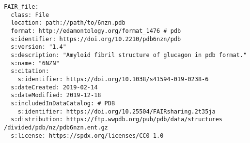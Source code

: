 \begin{verbatim}
FAIR_file:
  class: File
  location: path://path/to/6nzn.pdb
  format: http://edamontology.org/format_1476 # pdb
  s:identifier: https://doi.org/10.2210/pdb6nzn/pdb 
  s:version: "1.4"
  s:description: "Amyloid fibril structure of glucagon in pdb format."
  s:name: "6NZN"
  s:citation: 
    s:identifier: https://doi.org/10.1038/s41594-019-0238-6
  s:dateCreated: 2019-02-14
  s:dateModified: 2019-12-18 
  s:includedInDataCatalog: # PDB
    s:identifier: https://doi.org/10.25504/FAIRsharing.2t35ja
  s:distribution: https://ftp.wwpdb.org/pub/pdb/data/structures /divided/pdb/nz/pdb6nzn.ent.gz
  s:license: https://spdx.org/licenses/CC0-1.0
\end{verbatim}